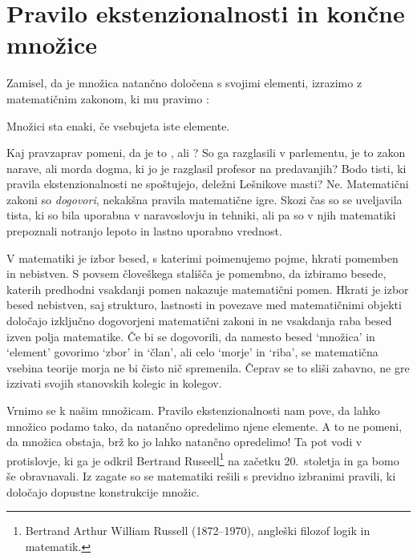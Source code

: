 \section{Pravilo ekstenzionalnosti in končne množice}
\label{sec:koncne-mnozice}
\label{sec:nacelo-ekstenzionalnosti}

Zamisel, da je množica natančno določena s svojimi elementi, izrazimo z matematičnim
zakonom, ki mu pravimo :

\begin{pravilo}
  Množici sta enaki, če vsebujeta iste elemente.
\end{pravilo}

Kaj pravzaprav pomeni, da je to ,  ali ? So ga
razglasili v parlementu, je to zakon narave, ali morda dogma, ki jo je razglasil profesor
na predavanjih? Bodo tisti, ki pravila ekstenzionalnosti ne spoštujejo, deležni Lešnikove
masti? Ne. Matematični zakoni so \emph{dogovori}, nekakšna pravila matematične igre. Skozi
čas so se uveljavila tista, ki so bila uporabna v naravoslovju in tehniki, ali pa so v njih
matematiki prepoznali notranjo lepoto in lastno uporabno vrednost.

V matematiki je izbor besed, s katerimi poimenujemo pojme, hkrati pomemben in nebistven.
%
S povsem človeškega stališča je pomembno, da izbiramo besede, katerih predhodni vsakdanji pomen nakazuje matematični pomen.
%
Hkrati je izbor besed nebistven, saj strukturo, lastnosti in povezave med
matematičnimi objekti določajo izključno dogovorjeni matematični zakoni in ne vsakdanja raba besed izven polja matematike.
%
Če bi se dogovorili, da namesto besed  `množica' in `element' govorimo `zbor' in `član', ali celo `morje' in `riba', se matematična vsebina teorije morja ne bi čisto nič spremenila.
%
Čeprav se to sliši zabavno, ne gre izzivati svojih stanovskih kolegic in kolegov.

Vrnimo se k našim množicam. Pravilo ekstenzionalnosti nam pove, da lahko množico podamo
tako, da natančno opredelimo njene elemente. A to ne pomeni, da množica obstaja, brž ko jo
lahko natančno opredelimo! Ta  pot vodi v protislovje, ki ga je odkril Bertrand Ruseell\footnote{Bertrand Arthur William Russell (1872--1970), angleški filozof logik in matematik.} na začetku 20.~stoletja in ga bomo še obravnavali.
Iz zagate so se matematiki rešili s previdno izbranimi pravili, ki določajo dopustne konstrukcije množic.

